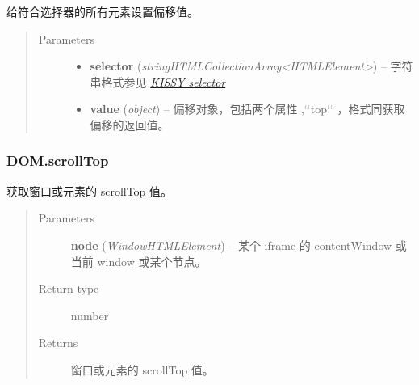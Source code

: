 \documentclass[letterpaper,10pt,english]{sphinxmanual}
\begin{document}
\begin{fulllineitems}
给符合选择器的所有元素设置偏移值。
\begin{quote}\begin{description}
\item[{Parameters}] \leavevmode\begin{itemize}
\item {}
\textbf{selector} (\emph{string\textbar{}HTMLCollection\textbar{}Array\textless{}HTMLElement\textgreater{}}) -- 字符串格式参见 {\hyperref[api/core/dom/selector:dom-selector]{\emph{KISSY selector}}}

\item {}
\textbf{value} (\emph{object}) -- 偏移对象，包括两个属性  ,{}`{}`top{}`{}` ，格式同获取偏移的返回值。

\end{itemize}

\end{description}\end{quote}

\end{fulllineitems}



\subsubsection{DOM.scrollTop}
\label{api/core/dom/scrollTop:dom-scrolltop}\label{api/core/dom/scrollTop::doc}

\begin{fulllineitems}
\label{api/core/dom/scrollTop:DOM.scrollTop}
获取窗口或元素的 scrollTop 值。
\begin{quote}\begin{description}
\item[{Parameters}] \leavevmode
\textbf{node} (\emph{Window\textbar{}HTMLElement}) -- 某个 iframe 的 contentWindow 或当前 window 或某个节点。

\item[{Return type}] \leavevmode
number

\item[{Returns}] \leavevmode
窗口或元素的 scrollTop 值。

\end{description}\end{quote}

\end{fulllineitems}
\end{document}
